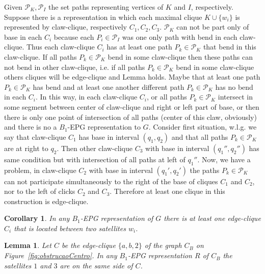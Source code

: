 \documentclass[9pt]{entcs}
\newtheorem{lema}{Lemma}[section]
\newtheorem{coro}{Corollary}[section]
\begin{document}
\begin{pf}
Given $\mathcal{P}_K, \mathcal{P}_I$ the set paths representing vertices of $K$ and $I$, respectively. 
Suppose there is a representation in which each maximal clique $K \cup \{w_i\}$ is represented by claw-clique, respectively $C_1, C_2, C_3$. $\mathcal{P}_K$ can not be part only of base in each $C_i$ because each $P_i \in \mathcal{P}_I$ was one only path with bend in each claw-clique. Thus each claw-clique $C_i$ has at least one path $P_k \in \mathcal{P}_K$ that bend in this claw-clique. If all paths $P_k \in \mathcal{P}_K$ bend in some claw-clique then these paths can not bend in other claw-clique, i.e. if all paths $P_k \in \mathcal{P}_K$ bend in some claw-clique others cliques will be edge-clique and Lemma holds. Maybe that at least one path $P_k \in \mathcal{P}_K$ has bend and at least one another different path $P_k \in \mathcal{P}_K$ has no bend in each $C_i$. In this way, in each claw-clique $C_i$, or all paths $P_k \in \mathcal{P}_K$ intersect in some segment between center of claw-clique and right or left part of base, or then there is only one point of intersection of all paths (center of this claw, obviously) and there is no a $B_1$-EPG representation to $G$. Consider first situation,  w.l.g. we say that claw-clique $C_1$ has base in interval $(q_1,q_2)$ and that all paths $P_k \in \mathcal{P}_K$ are  at right to $q_2$. Then other claw-clique $C_3$ with base in interval $(q_1'',q_2'')$ has same condition but with intersection of all paths at left of $q_1''$. Now, we have a problem, in claw-clique $C_2$ with base in interval $(q_1',q_2')$ the paths $P_k \in \mathcal{P}_K$ can not participate simultaneously to the right of the base of cliques $C_1$ and $C_2$, nor to the left of clicks $C_2$ and $C_3$. Therefore at least one clique in this construction is edge-clique.
\end{pf}


\begin{coro}\label{coro:3Cliques1EdgeClique}
In any $B_1$-EPG representation of $G$ there is at least one edge-clique $C_i$ that is located between two satellites $w_i$.
\end{coro}



\begin{lema} \label{lem:obstrucaoCentro}
Let $C$ be the edge-clique $\{a,b,2\}$ of the graph $C_B$ on Figure~\ref{fig:obstrucaoCentro}.
In any $B_1$-EPG representation $R$ of $C_{B}$  the satellites $1$ and $3$
are on the same side of $C$.
\end{lema}
\end{document}
